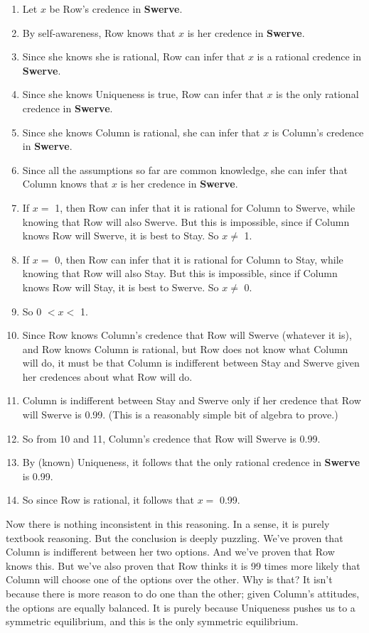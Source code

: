 \documentclass[12pt,]{article}
\providecommand{\tightlist}{%
  \setlength{\itemsep}{0pt}\setlength{\parskip}{0pt}}
\begin{document}
\begin{enumerate}
\def\labelenumi{\arabic{enumi}.}
\tightlist
\item
  Let \(x\) be Row's credence in \textbf{Swerve}.
\item
  By self-awareness, Row knows that \(x\) is her credence in \textbf{Swerve}.
\item
  Since she knows she is rational, Row can infer that \(x\) is a rational credence in \textbf{Swerve}.
\item
  Since she knows Uniqueness is true, Row can infer that \(x\) is the only rational credence in \textbf{Swerve}.
\item
  Since she knows Column is rational, she can infer that \(x\) is Column's credence in \textbf{Swerve}.
\item
  Since all the assumptions so far are common knowledge, she can infer that Column knows that \(x\) is her credence in \textbf{Swerve}.
\item
  If \(x =\) 1, then Row can infer that it is rational for Column to Swerve, while knowing that Row will also Swerve. But this is impossible, since if Column knows Row will Swerve, it is best to Stay. So \(x \neq\) 1.
\item
  If \(x =\) 0, then Row can infer that it is rational for Column to Stay, while knowing that Row will also Stay. But this is impossible, since if Column knows Row will Stay, it is best to Swerve. So \(x \neq\) 0.
\item
  So 0 \(< x <\) 1.
\item
  Since Row knows Column's credence that Row will Swerve (whatever it is), and Row knows Column is rational, but Row does not know what Column will do, it must be that Column is indifferent between Stay and Swerve given her credences about what Row will do.
\item
  Column is indifferent between Stay and Swerve only if her credence that Row will Swerve is 0.99. (This is a reasonably simple bit of algebra to prove.)
\item
  So from 10 and 11, Column's credence that Row will Swerve is 0.99.
\item
  By (known) Uniqueness, it follows that the only rational credence in \textbf{Swerve} is 0.99.
\item
  So since Row is rational, it follows that \(x =\) 0.99.
\end{enumerate}

Now there is nothing inconsistent in this reasoning. In a sense, it is purely textbook reasoning. But the conclusion is deeply puzzling. We've proven that Column is indifferent between her two options. And we've proven that Row knows this. But we've also proven that Row thinks it is 99 times more likely that Column will choose one of the options over the other. Why is that? It isn't because there is more reason to do one than the other; given Column's attitudes, the options are equally balanced. It is purely because Uniqueness pushes us to a symmetric equilibrium, and this is the only symmetric equilibrium.
\end{document}
